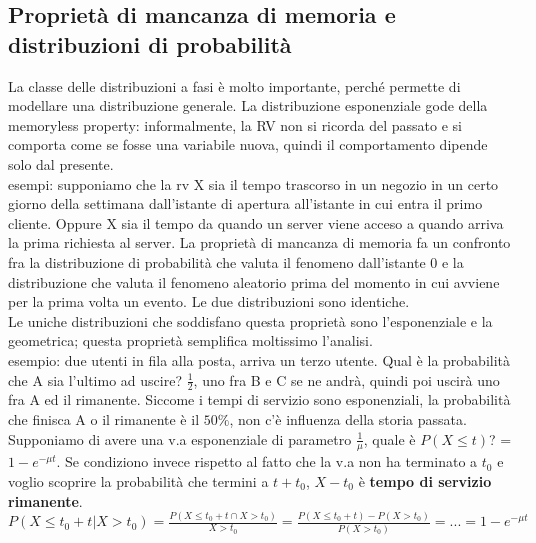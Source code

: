 \documentclass{article}
\begin{document}
\subsection{Proprietà di mancanza di memoria e distribuzioni di probabilità}
La classe delle distribuzioni a fasi è molto importante, perché permette di modellare una distribuzione generale. La distribuzione esponenziale gode della memoryless property: informalmente, la RV non si ricorda del passato e si comporta come se fosse una variabile nuova, quindi il comportamento dipende solo dal presente.\\ esempi: supponiamo che la rv X sia il tempo trascorso in un negozio in un certo giorno della settimana dall'istante di apertura all'istante in cui entra il primo cliente. Oppure X sia il tempo da quando un server viene acceso a quando arriva la prima richiesta al server. La proprietà di mancanza di memoria fa un confronto fra la distribuzione di probabilità che valuta il fenomeno dall'istante 0 e la distribuzione che valuta il fenomeno aleatorio prima del momento in cui avviene per la prima volta un evento. Le due distribuzioni sono identiche.\\ Le uniche distribuzioni che soddisfano questa proprietà sono l'esponenziale e la geometrica; questa proprietà semplifica moltissimo l'analisi.\\ esempio: due utenti in fila alla posta, arriva un terzo utente. Qual è la probabilità che A sia l'ultimo ad uscire? $\frac{1}{2}$, uno fra B e C se ne andrà, quindi poi uscirà uno fra A ed il rimanente. Siccome i tempi di servizio sono esponenziali, la probabilità che finisca A o il rimanente è il $50\%$, non c'è influenza della storia passata.\\ Supponiamo di avere una v.a esponenziale di parametro $\frac{1}{\mu}$, quale è $P(X \leq t)$? = $1 - e^{-\mu t}$. Se condiziono invece rispetto al fatto che la v.a non ha terminato a $t_0$ e voglio scoprire la probabilità che termini a $t + t_0$, $X - t_0$ è \textbf{tempo di servizio rimanente}.\\ $P(X \leq t_0 + t | X > t_0) = \frac{P(X \leq t_0 + t \cap X > t_0)}{X > t_0} = \frac{P(X \leq t_0 + t) - P(X > t_0)}{P(X > t_0)} = ... = 1- e^{-\mu t}$
\end{document}
